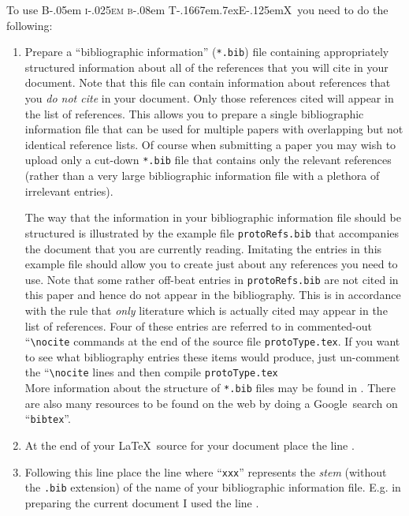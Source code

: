 \documentclass[times, doublespace]{anzsauth}
\newcommand\BibTeX{{\rmfamily B\kern-.05em \textsc{i\kern-.025em b}\kern-.08em
T\kern-.1667em\lower.7ex\hbox{E}\kern-.125emX}}
\begin{document}
To use \BibTeX\ you need to do the following:
\begin{enumerate}
\item Prepare a ``bibliographic information'' (\texttt{*.bib})
file containing appropriately structured information about all of
the references that you will cite in your document.  Note that this
file can contain information about references that you \emph{do not
cite} in your document.  Only those references cited will appear
in the list of references.  This allows you to prepare a single
bibliographic information file that can be used for multiple papers
with overlapping but not identical reference lists.  Of course
when submitting a paper you may wish to upload only a cut-down
\texttt{*.bib} file that contains only the relevant references
(rather than a very large bibliographic information file with a
plethora of irrelevant entries).

The way that the information in your bibliographic information
file should be structured is illustrated by the example file
\texttt{protoRefs.bib} that accompanies the document that you
are currently reading.  Imitating the entries in this example
file should allow you to create just about any references
you need to use.  Note that some rather off-beat entries in
\texttt{protoRefs.bib} are not cited in this paper and hence
do not appear in the bibliography.  This is in accordance with
the rule that \emph{only} literature which is actually cited
may appear in the list of references.  Four of these entries are
referred to in commented-out ``\verb!\nocite! commands at the end
of the source file \texttt{protoType.tex}.  If you want to see what
bibliography entries these items would produce, just un-comment the
``\verb!\nocite! lines and then compile \texttt{protoType.tex}\\

More information about the structure of \texttt{*.bib} files may
be found in \cite{MittelbachGoossens2004}.  There are also many
resources to be found on the web by doing a Google\texttrademark\
search on ``\texttt{bibtex}''.

\item At the end of your \LaTeX\ source for your document place the line
\verb!!.
\item Following this line place the line \verb!!
where ``\texttt{xxx}'' represents the \emph{stem} (without the \texttt{.bib}
extension) of the name of your bibliographic information file.
E.g. in preparing the current document I used the line
\verb!!.
\end{enumerate}
\end{document}
